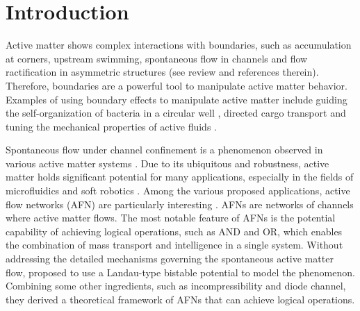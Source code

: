 \documentclass[%
10pt,
superscriptaddress,
twocolumn,
 amsmath,amssymb,
 aps,prx,
]{revtex4-2}
\begin{document}
\section{Introduction}

Active matter shows complex interactions with boundaries, such as accumulation at corners, upstream swimming, spontaneous flow in channels and flow ractification in asymmetric structures (see review \cite{Bechinger2016} and references therein).
Therefore, boundaries are a powerful tool to manipulate active matter behavior.
Examples of using boundary effects to manipulate active matter include guiding the self-organization of bacteria in a circular well \cite{Lushi2014, Wioland2016}, directed cargo transport \cite{Ghosh2020} and tuning the mechanical properties of active fluids \cite{Saintillan2018, Liu2019}.

Spontaneous flow under channel confinement is a phenomenon observed in various active matter systems \cite{Lushi2014,Wioland2016,Wu2017,Duclos2017,Morin2018,Hardouin2020}.
Due to its ubiquitous and robustness, active matter holds significant potential for many applications, especially in the fields of microfluidics and soft robotics \cite{}.
Among the various proposed applications, active flow networks (AFN) are particularly interesting \cite{Woodhouse2016,Woodhouse2017}.
AFNs are networks of channels where active matter flows.
The most notable feature of AFNs is the potential capability of achieving logical operations, such as AND and OR, which enables the combination of mass transport and intelligence in a single system. 
Without addressing the detailed mechanisms governing the spontaneous active matter flow, \citet{Woodhouse2017} proposed to use a Landau-type bistable potential to model the phenomenon. 
Combining some other ingredients, such as incompressibility and diode channel, they derived a theoretical framework of AFNs that can achieve logical operations.
\end{document}
